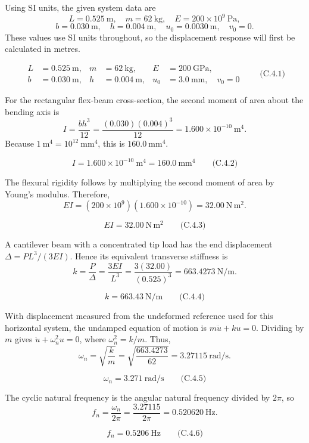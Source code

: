 Using SI units, the given system data are
\[
L=0.525\ \mathrm{m},\quad m=62\ \mathrm{kg},\quad E=200\times10^{9}\ \mathrm{Pa},
\]
\[
b=0.030\ \mathrm{m},\quad h=0.004\ \mathrm{m},\quad u_0=0.0030\ \mathrm{m},
\quad v_0=0.
\]
These values use SI units throughout, so the displacement response will first be calculated in metres.

\[
\boxed{\begin{aligned}
L&=0.525\ \mathrm{m}, &m&=62\ \mathrm{kg}, &E&=200\ \mathrm{GPa},\\
b&=0.030\ \mathrm{m}, &h&=0.004\ \mathrm{m}, &u_0&=3.0\ \mathrm{mm},\quad v_0=0
\end{aligned}}
\qquad\text{(C.4.1)}
\]

For the rectangular flex-beam cross-section, the second moment of area about the bending axis is
\[
I=\frac{bh^3}{12}
 =\frac{(0.030)(0.004)^3}{12}
 =1.600\times10^{-10}\ \mathrm{m^4}.
\]
Because \(1\ \mathrm{m^4}=10^{12}\ \mathrm{mm^4}\), this is \(160.0\ \mathrm{mm^4}\).

\[
\boxed{I=1.600\times10^{-10}\ \mathrm{m^4}=160.0\ \mathrm{mm^4}}
\qquad\text{(C.4.2)}
\]

The flexural rigidity follows by multiplying the second moment of area by Young's modulus. Therefore,
\[
EI=(200\times10^9)(1.600\times10^{-10})=32.00\ \mathrm{N\,m^2}.
\]

\[
\boxed{EI=32.00\ \mathrm{N\,m^2}}
\qquad\text{(C.4.3)}
\]

A cantilever beam with a concentrated tip load has the end displacement \(\Delta=PL^3/(3EI)\). Hence its equivalent transverse stiffness is
\[
k=\frac{P}{\Delta}=\frac{3EI}{L^3}
 =\frac{3(32.00)}{(0.525)^3}
 =663.4273\ \mathrm{N/m}.
\]

\[
\boxed{k=663.43\ \mathrm{N/m}}
\qquad\text{(C.4.4)}
\]

With displacement measured from the undeformed reference used for this horizontal system, the undamped equation of motion is \(m\ddot u+ku=0\). Dividing by \(m\) gives \(\ddot u+\omega_n^2u=0\), where \(\omega_n^2=k/m\). Thus,
\[
\omega_n=\sqrt{\frac{k}{m}}
 =\sqrt{\frac{663.4273}{62}}
 =3.27115\ \mathrm{rad/s}.
\]

\[
\boxed{\omega_n=3.271\ \mathrm{rad/s}}
\qquad\text{(C.4.5)}
\]

The cyclic natural frequency is the angular natural frequency divided by \(2\pi\), so
\[
f_n=\frac{\omega_n}{2\pi}=\frac{3.27115}{2\pi}=0.520620\ \mathrm{Hz}.
\]

\[
\boxed{f_n=0.5206\ \mathrm{Hz}}
\qquad\text{(C.4.6)}
\]

